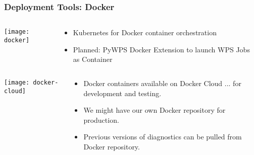 \documentclass{beamer}
\begin{document}
\begin{frame}
\frametitle<presentation>{Deployment Tools: Docker}

  \begin{columns}[c]
    \begin{column}{.2\textwidth}
      \texttt{[image: docker]}
    \end{column}
    \begin{column}{.8\textwidth}
      \begin{itemize}
        \item Kubernetes for Docker container orchestration
        \item Planned: PyWPS Docker Extension to launch WPS Jobs as Container
      \end{itemize}
    \end{column}
  \end{columns}
  \vrule
  \begin{columns}[c]
    \begin{column}{.2\textwidth}
      \texttt{[image: docker-cloud]}
    \end{column}
    \begin{column}{.8\textwidth}
      \begin{itemize}
        \item Docker containers available on Docker Cloud ... for development and testing.
        \item We might have our own Docker repository for production.
        \item Previous versions of diagnostics can be pulled from Docker repository.
      \end{itemize}
    \end{column}
  \end{columns}

\end{frame}
\end{document}
